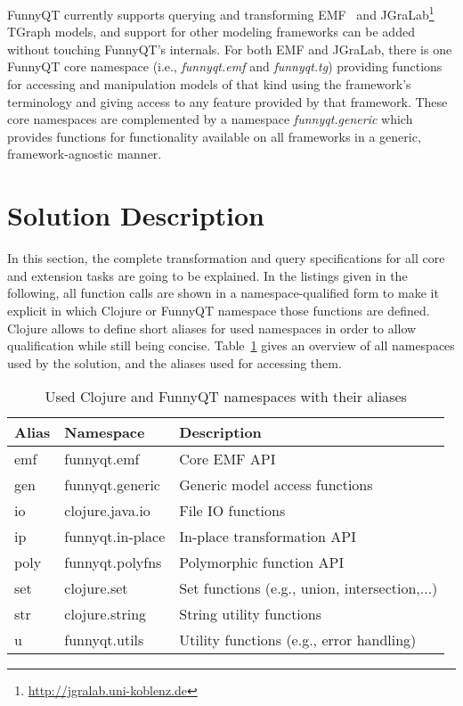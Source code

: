\documentclass[a4paper]{article}
\begin{document}
FunnyQT currently supports querying and transforming
EMF~\cite{Steinberg2008EEM} and
JGraLab\footnote{\url{http://jgralab.uni-koblenz.de}} TGraph models, and
support for other modeling frameworks can be added without touching FunnyQT's
internals.  For both EMF and JGraLab, there is one FunnyQT core namespace
(i.e., \emph{funnyqt.emf} and \emph{funnyqt.tg}) providing functions for
accessing and manipulation models of that kind using the framework's
terminology and giving access to any feature provided by that framework.  These
core namespaces are complemented by a namespace \emph{funnyqt.generic} which
provides functions for functionality available on all frameworks in a generic,
framework-agnostic manner.


\section{Solution Description}
\label{sec:solution-description}

In this section, the complete transformation and query specifications for all
core and extension tasks are going to be explained.  In the listings given in
the following, all function calls are shown in a namespace-qualified form to
make it explicit in which Clojure or FunnyQT namespace those functions are
defined.  Clojure allows to define short aliases for used namespaces in order
to allow qualification while still being concise.  Table~\ref{tab:namespaces}
gives an overview of all namespaces used by the solution, and the aliases used
for accessing them.

\begin{table}[h!t]
  \centering
  \begin{tabular}{| l | l | l |}
    \hline
    \textbf{Alias} & \textbf{Namespace} & \textbf{Description}\\
    \hline
    \textsf{emf}  & \textsf{funnyqt.emf}      & Core EMF API\\
    \textsf{gen}  & \textsf{funnyqt.generic}  & Generic model access functions\\
    \textsf{io}   & \textsf{clojure.java.io}  & File IO functions\\
    \textsf{ip}   & \textsf{funnyqt.in-place} & In-place transformation API\\
    \textsf{poly} & \textsf{funnyqt.polyfns}  & Polymorphic function API\\
    \textsf{set}  & \textsf{clojure.set}      & Set functions (e.g., union, intersection,...)\\
    \textsf{str}  & \textsf{clojure.string}   & String utility functions\\
    \textsf{u}    & \textsf{funnyqt.utils}    & Utility functions (e.g., error handling)\\
    \hline
  \end{tabular}
  \caption{Used Clojure and FunnyQT namespaces with their aliases}
  \label{tab:namespaces}
\end{table}
\end{document}
